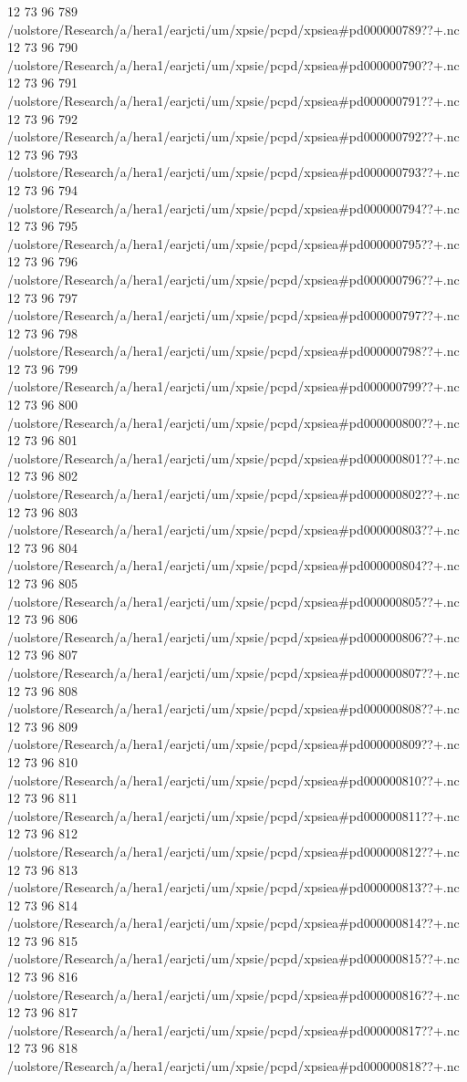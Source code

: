 12 73 96
789
/uolstore/Research/a/hera1/earjcti/um/xpsie/pcpd/xpsiea#pd000000789??+.nc
12 73 96
790
/uolstore/Research/a/hera1/earjcti/um/xpsie/pcpd/xpsiea#pd000000790??+.nc
12 73 96
791
/uolstore/Research/a/hera1/earjcti/um/xpsie/pcpd/xpsiea#pd000000791??+.nc
12 73 96
792
/uolstore/Research/a/hera1/earjcti/um/xpsie/pcpd/xpsiea#pd000000792??+.nc
12 73 96
793
/uolstore/Research/a/hera1/earjcti/um/xpsie/pcpd/xpsiea#pd000000793??+.nc
12 73 96
794
/uolstore/Research/a/hera1/earjcti/um/xpsie/pcpd/xpsiea#pd000000794??+.nc
12 73 96
795
/uolstore/Research/a/hera1/earjcti/um/xpsie/pcpd/xpsiea#pd000000795??+.nc
12 73 96
796
/uolstore/Research/a/hera1/earjcti/um/xpsie/pcpd/xpsiea#pd000000796??+.nc
12 73 96
797
/uolstore/Research/a/hera1/earjcti/um/xpsie/pcpd/xpsiea#pd000000797??+.nc
12 73 96
798
/uolstore/Research/a/hera1/earjcti/um/xpsie/pcpd/xpsiea#pd000000798??+.nc
12 73 96
799
/uolstore/Research/a/hera1/earjcti/um/xpsie/pcpd/xpsiea#pd000000799??+.nc
12 73 96
800
/uolstore/Research/a/hera1/earjcti/um/xpsie/pcpd/xpsiea#pd000000800??+.nc
12 73 96
801
/uolstore/Research/a/hera1/earjcti/um/xpsie/pcpd/xpsiea#pd000000801??+.nc
12 73 96
802
/uolstore/Research/a/hera1/earjcti/um/xpsie/pcpd/xpsiea#pd000000802??+.nc
12 73 96
803
/uolstore/Research/a/hera1/earjcti/um/xpsie/pcpd/xpsiea#pd000000803??+.nc
12 73 96
804
/uolstore/Research/a/hera1/earjcti/um/xpsie/pcpd/xpsiea#pd000000804??+.nc
12 73 96
805
/uolstore/Research/a/hera1/earjcti/um/xpsie/pcpd/xpsiea#pd000000805??+.nc
12 73 96
806
/uolstore/Research/a/hera1/earjcti/um/xpsie/pcpd/xpsiea#pd000000806??+.nc
12 73 96
807
/uolstore/Research/a/hera1/earjcti/um/xpsie/pcpd/xpsiea#pd000000807??+.nc
12 73 96
808
/uolstore/Research/a/hera1/earjcti/um/xpsie/pcpd/xpsiea#pd000000808??+.nc
12 73 96
809
/uolstore/Research/a/hera1/earjcti/um/xpsie/pcpd/xpsiea#pd000000809??+.nc
12 73 96
810
/uolstore/Research/a/hera1/earjcti/um/xpsie/pcpd/xpsiea#pd000000810??+.nc
12 73 96
811
/uolstore/Research/a/hera1/earjcti/um/xpsie/pcpd/xpsiea#pd000000811??+.nc
12 73 96
812
/uolstore/Research/a/hera1/earjcti/um/xpsie/pcpd/xpsiea#pd000000812??+.nc
12 73 96
813
/uolstore/Research/a/hera1/earjcti/um/xpsie/pcpd/xpsiea#pd000000813??+.nc
12 73 96
814
/uolstore/Research/a/hera1/earjcti/um/xpsie/pcpd/xpsiea#pd000000814??+.nc
12 73 96
815
/uolstore/Research/a/hera1/earjcti/um/xpsie/pcpd/xpsiea#pd000000815??+.nc
12 73 96
816
/uolstore/Research/a/hera1/earjcti/um/xpsie/pcpd/xpsiea#pd000000816??+.nc
12 73 96
817
/uolstore/Research/a/hera1/earjcti/um/xpsie/pcpd/xpsiea#pd000000817??+.nc
12 73 96
818
/uolstore/Research/a/hera1/earjcti/um/xpsie/pcpd/xpsiea#pd000000818??+.nc
